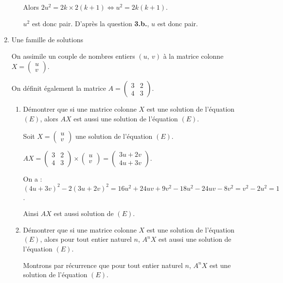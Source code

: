 \documentclass[12pt]{cornouaille}
\begin{document}
\begin{exercice}
\begin{enumerate}
\begin{enumerate}
\begin{solution}
Alors $2u^2=2k \times 2(k+1) \iff u^2=2k(k+1)$.

$u^2$ est donc pair. D'après la question \textbf{3.b.}, $u$ est donc pair.
\end{solution}
	\end{enumerate}
\item  Une famille de solutions
	
On assimile un couple de nombres entiers $(u,~v)$ à la matrice colonne $X = \begin{pmatrix}u\\v\end{pmatrix}$.
	
On définit également la matrice $A = \begin{pmatrix}3&2\\4&3\end{pmatrix}$.
	\begin{enumerate}
		\item Démontrer que si une matrice colonne $X$ est une solution de l'équation $(E)$, alors $AX$ est aussi une solution de l'équation $(E)$.
		
\begin{solution}
Soit $X=\begin{pmatrix}		u\\v		\end{pmatrix}$ une solution de l'équation $(E)$.
		
$AX=\begin{pmatrix} 3&2\\ 4&3 \end{pmatrix} \times \begin{pmatrix} u\\ v
\end{pmatrix}=\begin{pmatrix} 3u+2v\\ 4u+3v\end{pmatrix}$.

On a : $(4u+3v)^2-2(3u+2v)^2=16u^2+24uv+9v^2-18u^2-24uv-8v^2=v^2-2u^2=1$.

Ainsi $AX$ est aussi solution de $(E)$.
\end{solution}
		\item Démontrer que si une matrice colonne $X$ est une solution de l'équation $(E)$, alors pour tout entier naturel $n$,\: $A^n X$ est aussi une solution de l'équation $(E)$.
		
\begin{solution}
Montrons par récurrence que pour tout entier naturel $n$, $A^nX$ est une solution de l'équation $(E)$.
		

\end{solution}
\end{enumerate}
\end{enumerate}
\end{exercice}
\end{document}
